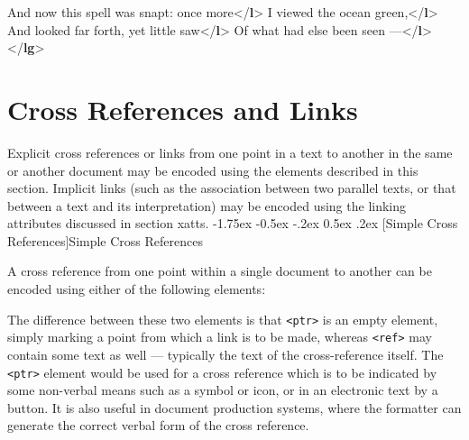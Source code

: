 \documentclass[11pt,twoside]{article}\makeatletter
\makeatletter
\renewcommand\section{\@startsection {section}{1}{\z@}%
     {-1.75ex \@plus -0.5ex \@minus -.2ex}%
     {0.5ex \@plus .2ex}%
     {\reset@font\Large\bfseries\sffamily}}
\renewcommand\subsection{\@startsection{subsection}{2}{\z@}%
     {-1.75ex\@plus -0.5ex \@minus- .2ex}%
     {0.5ex \@plus .2ex}%
     {\reset@font\Large\sffamily}}
\def\DivI{\section}
\def\DivII{\subsection}
\def\DivI{\chapter}
\def\DivII{\section}
\makeatother
\begin{document}
\begin{shaded}
And now this spell was snapt: once more{</\textbf{l}>}\mbox{}\newline 
{}I viewed the ocean green,{</\textbf{l}>}\mbox{}\newline 
{}And looked far forth, yet little saw{</\textbf{l}>}\mbox{}\newline 
{}Of what had else been seen —{</\textbf{l}>}\mbox{}\newline 
{</\textbf{lg}>}\end{shaded}\egroup\par 
\DivI[Cross References and Links]{Cross References and Links}\label{U5-ptrs}\par
Explicit cross references or links from one point in a text to another in the same or  another document may be encoded using the elements described in this section.   Implicit links (such as the association between two parallel texts, or that between a text and its interpretation) may be encoded using the linking attributes discussed in section xatts.
\DivII[Simple Cross References]{Simple Cross References}\label{ptrs}\par
A cross reference from one point within a single document to another can be encoded using either of the following elements:    \par
The difference between these two elements is that \texttt{<ptr>} is an empty element, simply marking a point from which a link is to be made, whereas \texttt{<ref>} may contain some text as well — typically the text of the cross-reference itself. The \texttt{<ptr>} element would be used for a cross reference which is to be indicated by some non-verbal means such as a symbol or icon, or in an electronic text by a button. It is also useful in document production systems, where the formatter can generate the correct verbal form of the cross reference.\par
\end{document}
